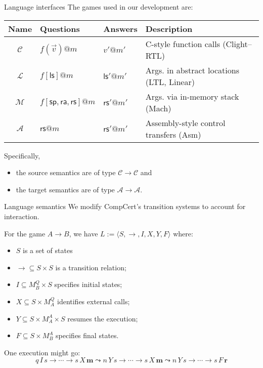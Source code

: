 \documentclass{beamer}
\newcommand{\kw}[1]{\ensuremath{ \mathsf{#1} }}
\begin{document}
\begin{frame}{Language interfaces} %
The games used in our development are:
\begin{center}
  \footnotesize
  \begin{tabular}{cllp{}}
    \hline
    Name & Questions & Answers & Description \\
    \hline
    $\mathcal{C}$ & $f(\vec{v})@m$ & $v'@m'$ &
      C-style function calls (Clight--RTL) \\
    $\mathcal{L}$ & $f[\kw{ls}]@m$ & $\kw{ls}'@m'$ &
      Args. in abstract locations (LTL, Linear) \\
    $\mathcal{M}$ & $f[\kw{sp},\kw{ra},\kw{rs}]@m$ & $\kw{rs}'@m'$ &
      Args. via in-memory stack (Mach) \\
    $\mathcal{A}$ & $\kw{rs}@m$ & $\kw{rs}'@m'$ &
      Assembly-style control transfers (Asm) \\
    \hline
  \end{tabular}
\end{center}

\vspace{1em}
Specifically,
\begin{itemize}
\item the source semantics are of type $\mathcal{C} \rightarrow \mathcal{C}$ and
\item the target semantics are of type $\mathcal{A} \rightarrow \mathcal{A}$.
\end{itemize}
\end{frame}

\begin{frame}{Language semantics} %
We modify CompCert's transition systems
to account for interaction.

\vspace{1ex}
For the game $A \rightarrow B$,
we have
$L := \langle S, \rightarrow, I, X, Y, F \rangle$ where:
\begin{itemize}
\item $S$ is a set of states
\item ${\rightarrow} \subseteq S \times S$ is a transition relation;
\item $I \subseteq M_B^Q \times S$ specifies initial states;
\item $X \subseteq S \times M_A^Q$ identifies external calls;
\item $Y \subseteq S \times M_A^A \times S$ resumes the execution;
\item $F \subseteq S \times M_B^A$ specifies final states.
\end{itemize}

\vspace{1ex}
One execution might go:
\small
\[
  q \, I \, s \rightarrow \cdots \rightarrow
  s \, X \, \mathbf{m} \leadsto n \, Y \, s \rightarrow \cdots \rightarrow
  s \, X \, \mathbf{m} \leadsto n \, Y \, s \rightarrow \cdots \rightarrow
  s \, F \, \mathbf{r}
\]
\end{frame}
\end{document}
